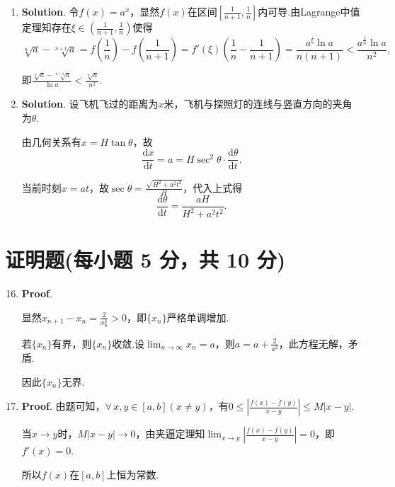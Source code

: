 \documentclass[../Main.tex]{subfiles}
\begin{document}
\begin{enumerate}
    \item \textbf{Solution}. 令$f(x)=a^{x}$，显然$f(x)$在区间$\left[\frac{1}{n+1}
                  ,\frac{1}{n}\right]$内可导.由Lagrange中值定理知存在$\xi\in\left(\frac{1}{n+1}
              ,\frac{1}{n}\right)$使得
          \[
              \sqrt[n]{a}-\sqrt[n+1]{a}=f\left(\frac{1}{n}\right)-f\left(\frac{1}{n+1}\right
              )=f'(\xi)\left(\frac{1}{n}-\frac{1}{n+1}\right)=\frac{a^{\xi}\ln a}{n(n+1)}
              <\frac{a^{\frac{1}{n}}\ln a}{n^{2}},
          \]

          即$\frac{\sqrt[n]{a}-\sqrt[n+1]{a}}{\ln a}<\frac{\sqrt[n]{a}}{n^{2}}$.

    \item \textbf{Solution}. 设飞机飞过的距离为$x$米，飞机与探照灯的连线与竖直方向的夹角为$\theta$.

          由几何关系有$x=H\tan\theta$，故
          \[
              \frac{\mathrm{d}x}{\mathrm{d}t}=a=H\sec^{2}\theta\cdot \frac{\mathrm{d}\theta}{\mathrm{d}t}
              .
          \]

          当前时刻$x=at$，故$\sec\theta=\frac{\sqrt{H^{2}+a^{2}t^{2}}}{H}$，代入上式得
          \[
              \frac{\mathrm{d}\theta}{\mathrm{d}t}=\frac{aH}{H^{2}+a^{2}t^{2}}.
          \]
\end{enumerate}

\section{证明题(每小题 5 分，共 10 分)}
\begin{enumerate}
    \setcounter{enumi}{15}
    \item \textbf{Proof}.

          显然$x_{n+1}-x_{n}=\frac{2}{x_{n}^{2}}>0$，即$\{x_{n}\}$严格单调增加.

          若$\{x_{n}\}$有界，则$\{x_{n}\}$收敛.设$\lim_{n\to\infty}x_{n}=a$，则$a=a+\frac{2}{a^{2}}$，此方程无解，矛盾.

          因此$\{x_{n}\}$无界.

    \item \textbf{Proof}. 由题可知，$\forall\,x,y\in[a,b](x\neq y)$，有$0\leq
              \left|\frac{f(x)-f(y)}{x-y}\right|\leq M|x-y|$.

          当$x\to y$时，$M|x-y|\to0$，由夹逼定理知$\lim_{x\to y}\left|\frac{f(x)-f(y)}{x-y}
              \right|=0$，即$f'(x)=0$.

          所以$f(x)$在$[a,b]$上恒为常数.
\end{enumerate}
\end{document}
